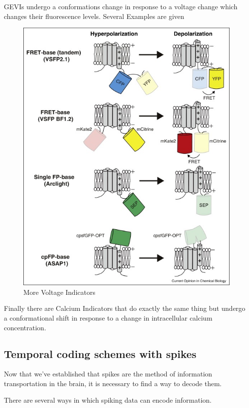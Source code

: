 \documentclass[main]{subfiles}
\begin{document}
GEVIs undergo a conformations change in response to a voltage change which changes their fluorescence levels. Several Examples are given
\begin{figure}[H]
	\centering
	\includegraphics[width=0.9\linewidth]{09_WhySpikes/figures/GEVIs.jpg}
	\caption{More Voltage Indicators}
\end{figure}

Finally there are Calcium Indicators that do exactly the same thing but undergo a conformational shift in response to a change in intracellular calcium concentration.

\subsection{Temporal coding schemes with spikes}

Now that we've established that spikes are the method of information transportation in the brain, it is necessary to find a way to decode them.

There are several ways in which spiking data can encode information.
\end{document}
